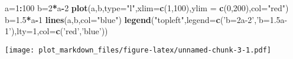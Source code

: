 \documentclass[]{article}
\newenvironment{Shaded}{\begin{snugshade}}{\end{snugshade}}
\newcommand{\KeywordTok}[1]{\textcolor[rgb]{0.13,0.29,0.53}{\textbf{#1}}}
\newcommand{\DataTypeTok}[1]{\textcolor[rgb]{0.13,0.29,0.53}{#1}}
\newcommand{\DecValTok}[1]{\textcolor[rgb]{0.00,0.00,0.81}{#1}}
\newcommand{\FloatTok}[1]{\textcolor[rgb]{0.00,0.00,0.81}{#1}}
\newcommand{\StringTok}[1]{\textcolor[rgb]{0.31,0.60,0.02}{#1}}
\newcommand{\OperatorTok}[1]{\textcolor[rgb]{0.81,0.36,0.00}{\textbf{#1}}}
\newcommand{\NormalTok}[1]{#1}
\begin{document}
\begin{Shaded}
\begin{Highlighting}[]
\NormalTok{a=}\DecValTok{1}\OperatorTok{:}\DecValTok{100}
\NormalTok{b=}\DecValTok{2}\OperatorTok{*}\NormalTok{a}\OperatorTok{-}\DecValTok{2}
\KeywordTok{plot}\NormalTok{(a,b,}\DataTypeTok{type=}\StringTok{"l"}\NormalTok{,}\DataTypeTok{xlim=}\KeywordTok{c}\NormalTok{(}\DecValTok{1}\NormalTok{,}\DecValTok{100}\NormalTok{),}\DataTypeTok{ylim =} \KeywordTok{c}\NormalTok{(}\DecValTok{0}\NormalTok{,}\DecValTok{200}\NormalTok{),}\DataTypeTok{col=}\StringTok{"red"}\NormalTok{)}
\NormalTok{b=}\FloatTok{1.5}\OperatorTok{*}\NormalTok{a}\OperatorTok{-}\DecValTok{1}
\KeywordTok{lines}\NormalTok{(a,b,}\DataTypeTok{col=}\StringTok{"blue"}\NormalTok{)}
\KeywordTok{legend}\NormalTok{(}\StringTok{"topleft"}\NormalTok{,}\DataTypeTok{legend=}\KeywordTok{c}\NormalTok{(}\StringTok{'b=2a-2'}\NormalTok{,}\StringTok{'b=1.5a-1'}\NormalTok{),}\DataTypeTok{lty=}\DecValTok{1}\NormalTok{,}\DataTypeTok{col=}\KeywordTok{c}\NormalTok{(}\StringTok{'red'}\NormalTok{,}\StringTok{'blue'}\NormalTok{))}
\end{Highlighting}
\end{Shaded}

\texttt{[image: plot\_markdown\_files/figure-latex/unnamed-chunk-3-1.pdf]}
\end{document}
